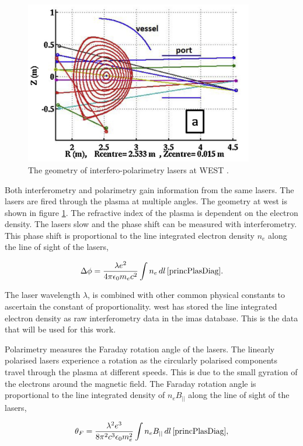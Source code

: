 \begin{figure}[H]
  \centering
  \includegraphics[width=10cm]{images/interfgeo.png}
  \caption{The geometry of interfero-polarimetry lasers at WEST \cite{westinterfero}.}
  \label{fig:interfgeo}
\end{figure}

Both interferometry and polarimetry gain information from the same lasers. The lasers are fired through the plasma at multiple angles. The geometry at \gls{west} is shown in figure \ref{fig:interfgeo}. The refractive index of the plasma is dependent on the electron density. The lasers slow and the phase shift can be measured with interferometry. This phase shift is proportional to the line integrated electron density $n_e$ along the line of sight of the lasers,

\begin{equation} 
  \label{eq:int_phase}
  \Delta\phi = \frac{\lambda e^{2}}{4 \pi \epsilon_0 m_e c^2 } \int n_e \, dl \, \cite{princPlasDiag}.
\end{equation}

\noindent The laser wavelength $\lambda$, is combined with other common physical constants to ascertain the constant of proportionality. \gls{west} has stored the line integrated electron density as raw interferometry data in the \gls{imas} database. This is the data that will be used for this work.

Polarimetry measures the Faraday rotation angle of the lasers. The linearly polarised lasers experience a rotation as the circularly polarised components travel through the plasma at different speeds. This is due to the small gyration of the electrons around the magnetic field. The Faraday rotation angle is proportional to the line integrated density of $n_e B_{||}$ along the line of sight of the lasers, 

\begin{equation}
  \label{eq:pol_farad}
  \theta_F = \frac{\lambda^2 e^3}{8 \pi^2 c^3 \epsilon_0 m_e^2} \int n_e B_{||} \, dl \, \cite{princPlasDiag},
\end{equation}

